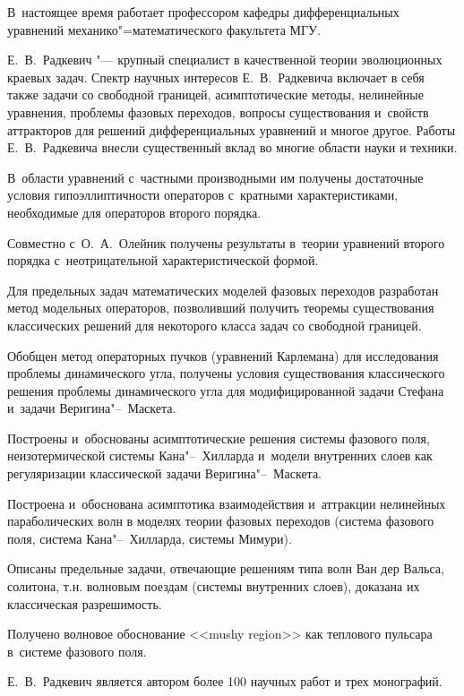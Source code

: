 В~настоящее время работает профессором кафедры дифференциальных уравнений механико"=математического факультета МГУ.



Е.~В.~Радкевич "--- крупный специалист в качественной теории эволюционных краевых задач. Спектр научных интересов Е.~В.~Радкевича включает в себя также задачи со свободной границей, асимптотические методы, нелинейные уравнения, проблемы фазовых переходов, вопросы существования и~свойств аттракторов для решений дифференциальных уравнений и многое другое. Работы Е.~В.~Радкевича внесли существенный вклад во многие области науки и техники.



В~области уравнений с~частными производными им получены достаточные условия гипоэллиптичности операторов с~кратными характеристиками, необходимые для операторов второго порядка. 

Совместно с~О.~А.~Олейник получены результаты в~теории уравнений второго порядка с~неотрицательной характеристической формой. 

Для предельных задач математических моделей фазовых переходов разработан метод модельных операторов, позволивший получить теоремы существования классических решений для некоторого класса задач со свободной границей. 

Обобщен метод операторных пучков (уравнений Карлемана) для исследования проблемы динамического угла, получены условия существования классического решения проблемы динамического угла для модифицированной задачи Стефана и~задачи Веригина"--~Маскета. 

Построены и~обоснованы асимптотические решения системы фазового поля, неизотермической системы Кана"--~Хилларда и~модели внутренних слоев как регуляризации классической задачи Веригина"--~Маскета. 

Построена и~обоснована асимптотика взаимодействия и~аттракции нелинейных параболических волн в моделях теории фазовых переходов (система фазового поля, система Кана"--~Хилларда, системы Мимури). 

Описаны предельные задачи, отвечающие решениям типа волн Ван дер Вальса, солитона, т.н. волновым поездам (системы внутренних слоев), доказана их классическая разрешимость. 

Получено волновое обоснование <<mushy region>> как теплового пульсара в~системе фазового поля. 





Е.~В.~Радкевич является автором более 100 научных работ и трех монографий. 

